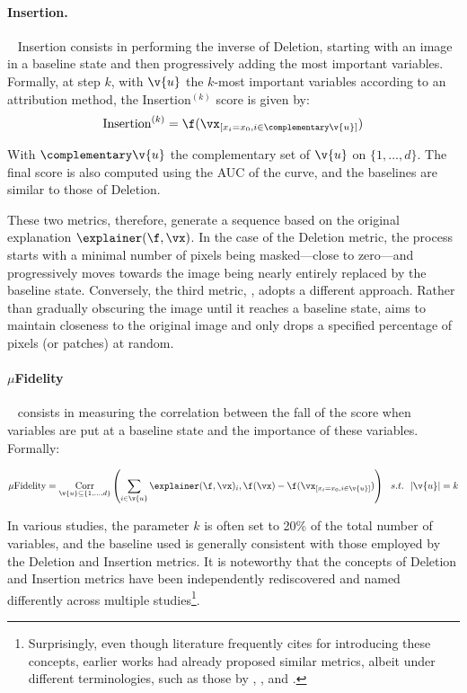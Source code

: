 \paragraph{Insertion.}~\cite{petsiuk2018rise}
Insertion consists in performing the inverse of Deletion, starting with an image in a baseline state and then progressively adding the most important variables. Formally, at step $k$, with $\v{u}$ the $k$-most important variables according to an attribution method, the Insertion$^{(k)}$ score is given by:
$$
\text{Insertion}^{(k)} = \f(\vx_{[x_i = x_0, i \in \complementary\v{u}]})
$$

With $\complementary\v{u}$ the complementary set of $\v{u}$ on $\{1, \ldots, d\}$. The final score is also computed using the AUC of the curve, and the baselines are similar to those of Deletion.

These two metrics, therefore, generate a sequence based on the original explanation $\explainer(\f, \vx)$. In the case of the Deletion metric, the process starts with a minimal number of pixels being masked—close to zero—and progressively moves towards the image being nearly entirely replaced by the baseline state. Conversely, the third metric, \muf, adopts a different approach. Rather than gradually obscuring the image until it reaches a baseline state, aims to maintain closeness to the original image and only drops a specified percentage of pixels (or patches) at random.

\paragraph{$\mu$Fidelity}~\cite{aggregating2020} consists in measuring the correlation between the fall of the score when variables are put at a baseline state and the importance of these variables. Formally:

$$
\mu\text{Fidelity} = \underset{\v{u} \subseteq \{1, ..., d\}}{\operatorname{Corr}}\left( \sum_{i \in \v{u}} \explainer(\f, \vx)_i  , \f(\vx) - \f(\vx_{[x_i = x_0, i \in \v{u}]})\right) ~~s.t.~~ |\v{u}| = k
$$

In various studies, the parameter $k$ is often set to 20\% of the total number of variables, and the baseline used is generally consistent with those employed by the Deletion and Insertion metrics. It is noteworthy that the concepts of Deletion and Insertion metrics have been independently rediscovered and named differently across multiple studies\footnote{Surprisingly, even though literature frequently cites \cite{petsiuk2018rise} for introducing these concepts, earlier works had already proposed similar metrics, albeit under different terminologies, such as those by \cite{samek2015evaluating}, \cite{fong2017meaningful}, and \cite{kapishnikov2019xrai}.}.

